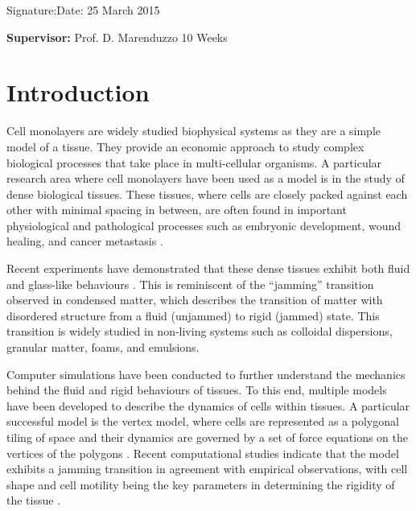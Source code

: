 \documentclass[a4paper,12pt]{article}
\begin{document}
\vspace*{2cm}
Signature:\hspace*{8cm}Date: 25 March 2015

\vfill
{\bf Supervisor:} Prof. D. Marenduzzo                 %
\hfill
10 Weeks                                         %
\newpage
%
\pagestyle{plain}                               %
\setcounter{page}{1}                            %
\tableofcontents                                %

\break
\section{Introduction}
Cell monolayers are widely studied biophysical systems as they are a simple model of a tissue. They provide an economic approach to study complex biological processes that take place in multi-cellular organisms. A particular research area where cell monolayers have been used as a model is in the study of dense biological tissues. These tissues, where cells are closely packed against each other with minimal spacing in between, are often found in important physiological and pathological processes such as embryonic development, wound healing, and cancer metastasis \cite{friedl2009}.  

Recent experiments have demonstrated that these dense tissues exhibit both fluid and glass-like behaviours \cite{angelini2010, schoetz2013}. This is reminiscent of the ``jamming'' transition observed in condensed matter, which describes the transition of matter with disordered structure from a fluid (unjammed) to rigid (jammed) state. This transition is widely studied in non-living systems such as colloidal dispersions, granular matter, foams, and emulsions. 

Computer simulations have been conducted to further understand the mechanics behind the fluid and rigid behaviours of tissues. To this end, multiple models have been developed to describe the dynamics of cells within tissues. A particular successful model is the vertex model, where cells are represented as a polygonal tiling of space and their dynamics are governed by a set of force equations on the vertices of the polygons \cite{nagai2001}. Recent computational studies indicate that the model exhibits a jamming transition in agreement with empirical observations, with cell shape and cell motility being the key parameters in determining the rigidity of the tissue \cite{bi2015density, bi2015motility}.
\end{document}

